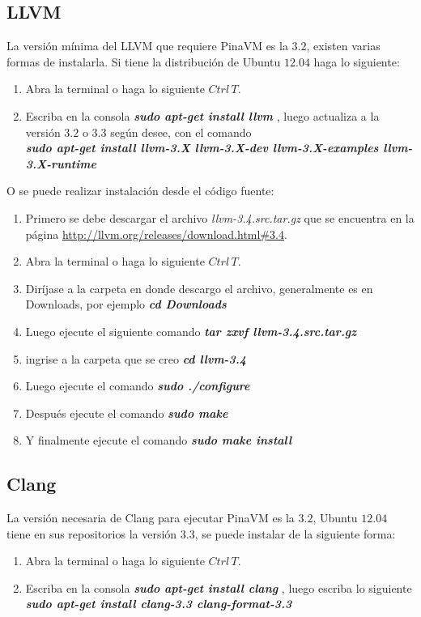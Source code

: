 \documentclass[12pt,graphicx,caption,rotating]{article}
\begin{document}
\subsection{LLVM}
\noindent
La versión mínima del LLVM que requiere PinaVM es la $3.2$, existen varias formas de instalarla. Si tiene la distribución de Ubuntu $12.04$ haga lo siguiente:
\begin{enumerate}
 \item Abra la terminal o haga lo siguiente $Ctrl \, T$.
 \item Escriba en la consola \textbf{\textit{sudo apt-get install llvm}} , luego actualiza a la versión $3.2$ o $3.3$ según desee, con el comando\\ \textbf{\textit{sudo apt-get install llvm-3.X llvm-3.X-dev llvm-3.X-examples llvm-3.X-runtime}} 
\end{enumerate}
\noindent
O se puede realizar instalación desde el código fuente:
\begin{enumerate}
 \item Primero se debe descargar el archivo \textit{llvm-3.4.src.tar.gz} que se encuentra en la página \url{http://llvm.org/releases/download.html#3.4}.
 \item Abra la terminal o haga lo siguiente $Ctrl \, T$.
 \item Diríjase	 a la carpeta en donde descargo el archivo, generalmente es en Downloads, por ejemplo \textbf{\textit{cd Downloads}}
 \item Luego ejecute el siguiente comando \textbf{\textit{tar zxvf llvm-3.4.src.tar.gz}} 
 \item ingrise a la carpeta que se creo \textbf{\textit{cd llvm-3.4}}
 \item Luego ejecute el comando \textbf{\textit{sudo ./configure}}
 \item Después ejecute el comando \textbf{\textit{sudo make}}
 \item Y finalmente ejecute el comando \textbf{\textit{sudo make install}}
\end{enumerate}

\subsection{Clang}
\noindent
La versión necesaria de Clang para ejecutar PinaVM es la $3.2$, Ubuntu $12.04$ tiene en sus repositorios la versión $3.3$, se puede instalar de la siguiente forma:
\begin{enumerate}
 \item Abra la terminal o haga lo siguiente $Ctrl \, T$.
 \item Escriba en la consola \textbf{\textit{sudo apt-get install clang}} , luego escriba lo siguiente \textbf{\textit{sudo apt-get install clang-3.3 clang-format-3.3}} 
\end{enumerate}
\end{document}
